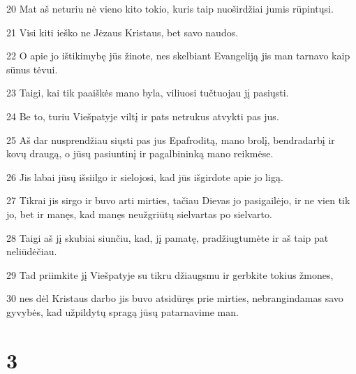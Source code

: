 \par 20 Mat aš neturiu nė vieno kito tokio, kuris taip nuoširdžiai jumis rūpintųsi. 
\par 21 Visi kiti ieško ne Jėzaus Kristaus, bet savo naudos. 
\par 22 O apie jo ištikimybę jūs žinote, nes skelbiant Evangeliją jis man tarnavo kaip sūnus tėvui. 
\par 23 Taigi, kai tik paaiškės mano byla, viliuosi tučtuojau jį pasiųsti. 
\par 24 Be to, turiu Viešpatyje viltį ir pats netrukus atvykti pas jus. 
\par 25 Aš dar nusprendžiau siųsti pas jus Epafroditą, mano brolį, bendradarbį ir kovų draugą, o jūsų pasiuntinį ir pagalbininką mano reikmėse. 
\par 26 Jis labai jūsų išsiilgo ir sielojosi, kad jūs išgirdote apie jo ligą. 
\par 27 Tikrai jis sirgo ir buvo arti mirties, tačiau Dievas jo pasigailėjo, ir ne vien tik jo, bet ir manęs, kad manęs neužgriūtų sielvartas po sielvarto. 
\par 28 Taigi aš jį skubiai siunčiu, kad, jį pamatę, pradžiugtumėte ir aš taip pat neliūdėčiau. 
\par 29 Tad priimkite jį Viešpatyje su tikru džiaugsmu ir gerbkite tokius žmones, 
\par 30 nes dėl Kristaus darbo jis buvo atsidūręs prie mirties, nebrangindamas savo gyvybės, kad užpildytų spragą jūsų patarnavime man.


\chapter{3}


